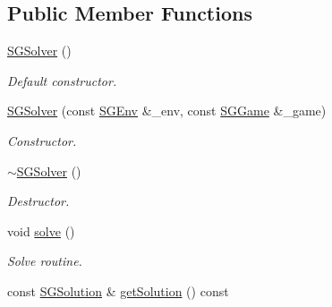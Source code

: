 \subsection*{Public Member Functions}
\begin{DoxyCompactItemize}
\item 
\mbox{\label{classSGSolver_ac768d9149f5f3859be36ea21a50a888f}} 
\hyperlink{classSGSolver_ac768d9149f5f3859be36ea21a50a888f}{S\+G\+Solver} ()
\begin{DoxyCompactList}\small\item\em Default constructor. \end{DoxyCompactList}\item 
\hyperlink{classSGSolver_afb38b33644c2768446f3a247f02dd643}{S\+G\+Solver} (const \hyperlink{classSGEnv}{S\+G\+Env} \&\+\_\+env, const \hyperlink{classSGGame}{S\+G\+Game} \&\+\_\+game)
\begin{DoxyCompactList}\small\item\em Constructor. \end{DoxyCompactList}\item 
\mbox{\label{classSGSolver_ae1d3f7acdcc65956a1539ed09c44e49c}} 
\hyperlink{classSGSolver_ae1d3f7acdcc65956a1539ed09c44e49c}{$\sim$\+S\+G\+Solver} ()
\begin{DoxyCompactList}\small\item\em Destructor. \end{DoxyCompactList}\item 
void \hyperlink{classSGSolver_a220dd431eabdd9ff8419fafb28b7b990}{solve} ()
\begin{DoxyCompactList}\small\item\em Solve routine. \end{DoxyCompactList}\item 
const \hyperlink{classSGSolution}{S\+G\+Solution} \& \hyperlink{classSGSolver_aeab5f94c8cc185aa08678ec4f1f859d4}{get\+Solution} () const
\end{DoxyCompactItemize}
